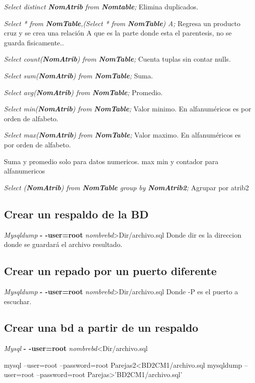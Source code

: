 \documentclass[12pt, fleqn]{report}                             %
\theoremstyle{break}                                            %
\begin{document}
    \emph{Select distinct  \textbf{NomAtrib} from \textbf{Nomtable};} Elimina duplicados.

    \emph{Select * from \textbf{NomTable},(\emph{Select * from \textbf{NomTable}}) A;} Regresa un producto cruz  y se crea una relación A que es la parte donde esta el parentesis, no se guarda fisicamente..


      \emph{Select count(\textbf{NomAtrib}) from \textbf{NomTable};} Cuenta tuplas sin contar nulls.


      \emph{Select sum(\textbf{NomAtrib}) from \textbf{NomTable};} Suma.

      \emph{Select avg(\textbf{NomAtrib}) from \textbf{NomTable};} Promedio.

      \emph{Select min(\textbf{NomAtrib}) from \textbf{NomTable};} Valor minimo. En alfanuméricos es por orden de alfabeto.

      \emph{Select max(\textbf{NomAtrib}) from \textbf{NomTable};} Valor maximo. En alfanuméricos es por orden de alfabeto.


      Suma y promedio solo para datos numericos.
      max min y contador para alfanumericos

      \emph{Select (\textbf{NomAtrib}) from \textbf{NomTable} group by \textbf{NomAtrib2};} Agrupar por atrib2

    \subsection{Crear un respaldo de la BD}
    \emph{Mysqldump } \textbf{- -user=root}  \emph{nombrebd}>Dir/archivo.sql
    Donde dir es la direccion donde se guardará el archivo resultado.

    \subsection{Crear un repado por un puerto diferente}
    \emph{Mysqldump } \textbf{- -user=root}  \emph{nombrebd}>Dir/archivo.sql
    Donde -P es el puerto a escuchar.
    \subsection{Crear una bd a partir de un respaldo}
    \emph{Mysql} \textbf{- -user=root}    \emph{nombrebd}<Dir/archivo.sql


    


    mysql --user=root --password=root Parejas2<BD2CM1/archivo.sql
    mysqldump --user=root --password=root Parejas>'BD2CM1/archivo.sql'
\end{document}
